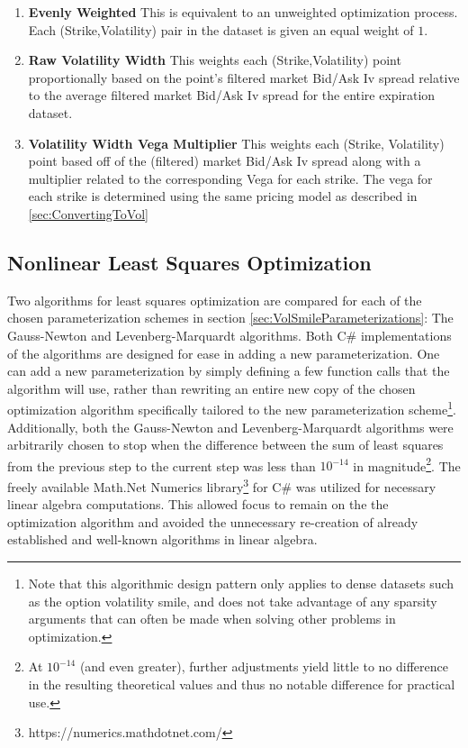 \documentclass[12pt, a4paper, notitlepage]{article}
\numberwithin{equation}{subsection}
\numberwithin{figure}{subsection}
\numberwithin{table}{subsection}
\newcommand{\newpar}{\newline \newline}
\begin{document}
\begin{enumerate}
	\item \textbf{Evenly Weighted} \newline This is equivalent to an unweighted optimization process.  Each (Strike,Volatility) pair in the dataset is given an equal weight of $1$.
    \item \textbf{Raw Volatility Width} \newline This weights each (Strike,Volatility) point proportionally based on the point's filtered market Bid/Ask Iv spread relative to the average filtered market Bid/Ask Iv spread for the entire expiration dataset.
    \item \textbf{Volatility Width Vega Multiplier} \newline This weights each (Strike, Volatility) point based off of the (filtered) market Bid/Ask Iv spread along with a multiplier related to the corresponding Vega for each strike.  The vega for each strike is determined using the same pricing model as described in \ref{sec:ConvertingToVol}
\end{enumerate}

\subsection{Nonlinear Least Squares Optimization}
Two algorithms for least squares optimization are compared for each of the chosen parameterization schemes in section \ref{sec:VolSmileParameterizations}:  The Gauss-Newton and Levenberg-Marquardt algorithms.  Both C\# implementations of the algorithms are designed for ease in adding a new parameterization.  One can add a new parameterization by simply defining a few function calls that the algorithm will use, rather than rewriting an entire new copy of the chosen optimization algorithm specifically tailored to the new parameterization scheme\footnote{Note that this algorithmic design pattern only applies to dense datasets such as the option volatility smile, and does not take advantage of any sparsity arguments that can often be made when solving other problems in optimization.}.  Additionally, both the Gauss-Newton and Levenberg-Marquardt algorithms were arbitrarily chosen to stop when the difference between the sum of least squares from the previous step to the current step was less than $10^{-14}$ in magnitude\footnote{At $10^{-14}$ (and even greater), further adjustments yield little to no difference in the resulting theoretical values and thus no notable difference for practical use.}.
\newpar
The freely available Math.Net Numerics library\footnote{https://numerics.mathdotnet.com/} for C\# was utilized for necessary linear algebra computations.  This allowed focus to remain on the the optimization algorithm and avoided the unnecessary re-creation of already established and well-known algorithms in linear algebra.
\end{document}
